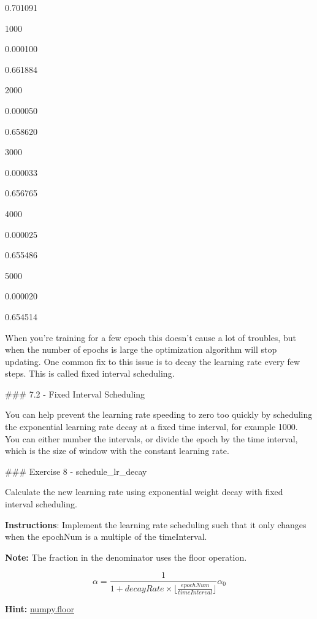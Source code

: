 \documentclass[11pt]{article}
\begin{document}
0.701091

1000

0.000100

0.661884

2000

0.000050

0.658620

3000

0.000033

0.656765

4000

0.000025

0.655486

5000

0.000020

0.654514

When you're training for a few epoch this doesn't cause a lot of
troubles, but when the number of epochs is large the optimization
algorithm will stop updating. One common fix to this issue is to decay
the learning rate every few steps. This is called fixed interval
scheduling.

    \#\#\# 7.2 - Fixed Interval Scheduling

You can help prevent the learning rate speeding to zero too quickly by
scheduling the exponential learning rate decay at a fixed time interval,
for example 1000. You can either number the intervals, or divide the
epoch by the time interval, which is the size of window with the
constant learning rate.

    \#\#\# Exercise 8 - schedule\_lr\_decay

Calculate the new learning rate using exponential weight decay with
fixed interval scheduling.

\textbf{Instructions}: Implement the learning rate scheduling such that
it only changes when the epochNum is a multiple of the timeInterval.

\textbf{Note:} The fraction in the denominator uses the floor operation.

\[\alpha = \frac{1}{1 + decayRate \times \lfloor\frac{epochNum}{timeInterval}\rfloor} \alpha_{0}\]

\textbf{Hint:}
\href{https://numpy.org/doc/stable/reference/generated/numpy.floor.html}{numpy.floor}
\end{document}

